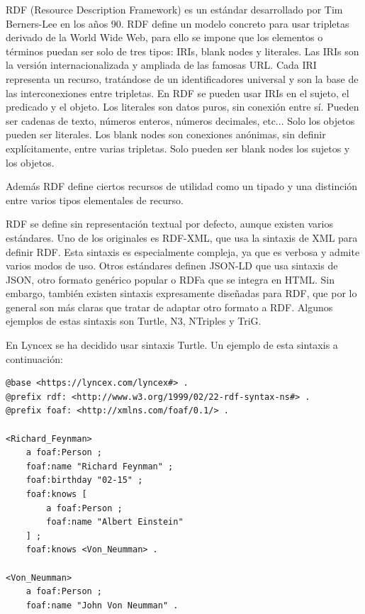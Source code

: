 \documentclass[12pt]{report} %
\begin{document}
RDF (Resource Description Framework) es un estándar desarrollado por Tim Berners-Lee en los años 90.
RDF define un modelo concreto para usar tripletas derivado de la World Wide Web, para ello se impone que los elementos o términos puedan ser solo de tres tipos: IRIs, blank nodes y literales.
Las IRIs son la versión internacionalizada y ampliada de las famosas URL. Cada IRI representa un recurso, tratándose de un identificadores universal y son la base de las interconexiones entre tripletas. En RDF se pueden usar IRIs en el sujeto, el predicado y el objeto.
Los literales son datos puros, sin conexión entre sí. Pueden ser cadenas de texto, números enteros, números decimales, etc... Solo los objetos pueden ser literales.
Los blank nodes son conexiones anónimas, sin definir explícitamente, entre varias tripletas. Solo pueden ser blank nodes los sujetos y los objetos.

Además RDF define ciertos recursos de utilidad como un tipado y una distinción entre varios tipos elementales de recurso.

RDF se define sin representación textual por defecto, aunque existen varios estándares. Uno de los originales es RDF-XML, que usa la sintaxis de XML para definir RDF. Esta sintaxis es especialmente compleja, ya que es verbosa y admite varios modos de uso.
Otros estándares definen JSON-LD que usa sintaxis de JSON, otro formato genérico popular o RDFa que se integra en HTML. Sin embargo, también existen sintaxis expresamente diseñadas para RDF, que por lo general son más claras que tratar de adaptar otro formato a RDF.
Algunos ejemplos de estas sintaxis son Turtle, N3, NTriples y TriG.

En Lyncex se ha decidido usar sintaxis Turtle. Un ejemplo de esta sintaxis a continuación:

\begin{lstlisting}
@base <https://lyncex.com/lyncex#> .
@prefix rdf: <http://www.w3.org/1999/02/22-rdf-syntax-ns#> .
@prefix foaf: <http://xmlns.com/foaf/0.1/> .

<Richard_Feynman>
    a foaf:Person ;
    foaf:name "Richard Feynman" ;
    foaf:birthday "02-15" ;
    foaf:knows [
        a foaf:Person ;
        foaf:name "Albert Einstein"
    ] ;
    foaf:knows <Von_Neumman> .

<Von_Neumman>
    a foaf:Person ;
    foaf:name "John Von Neumman" .
\end{lstlisting}
\end{document}
